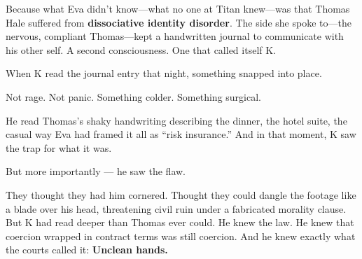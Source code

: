 Because what Eva didn’t know—what no one at Titan knew—was that Thomas Hale suffered from \textbf{dissociative identity disorder}.
The side she spoke to—the nervous, compliant Thomas—kept a handwritten journal to communicate with his other self.
A second consciousness.
One that called itself K.

When K read the journal entry that night, something snapped into place.

Not rage. Not panic.
Something colder.
Something surgical.

He read Thomas’s shaky handwriting describing the dinner, the hotel suite, the casual way Eva had framed it all as “risk insurance.”
And in that moment, K saw the trap for what it was.

But more importantly —
he saw the flaw.

They thought they had him cornered.
Thought they could dangle the footage like a blade over his head, threatening civil ruin under a fabricated morality clause.
But K had read deeper than Thomas ever could.
He knew the law.
He knew that coercion wrapped in contract terms was still coercion.
And he knew exactly what the courts called it: \textbf{Unclean hands.}

